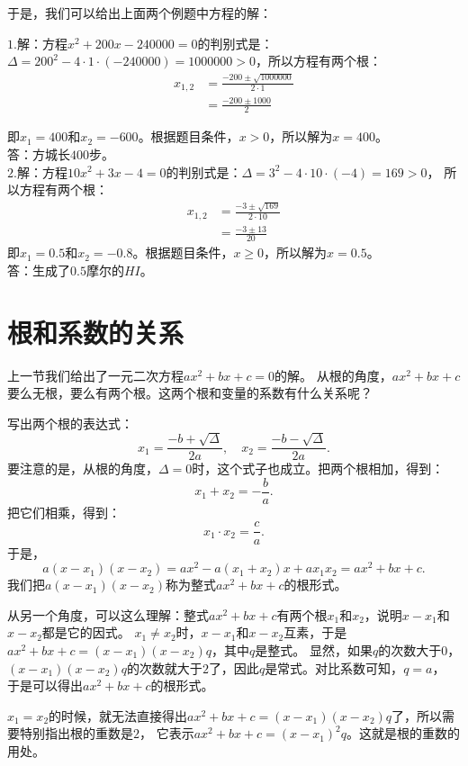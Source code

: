 \documentclass[12pt,UTF8]{ctexbook}
\begin{document}
于是，我们可以给出上面两个例题中方程的解：
\begin{so}
    $1.$解：方程$ x^2 + 200x - 240000 = 0$的判别式是：
    $\Delta = 200^2 - 4\cdot 1\cdot (-240000) = 1000000 > 0$，所以方程有两个根：
    \begin{align*}
        x_{1,2} &= \frac{-200 \pm \sqrt{1000000}}{2\cdot 1}  \\
        &= \frac{-200 \pm 1000}{2} 
    \end{align*}

    即$x_1 = 400$和$x_2 = -600$。根据题目条件，$x>0$，所以解为$x = 400$。\\
    答：方城长$400$步。\\
    $2.$解：方程$10x^2 + 3x - 4 = 0$的判别式是：$\Delta = 3^2 - 4\cdot 10\cdot (-4) = 169 > 0$，
    所以方程有两个根：
    \begin{align*}
        x_{1,2} &= \frac{-3 \pm \sqrt{169}}{2\cdot 10}  \\
        &= \frac{-3 \pm 13}{20} 
    \end{align*}
    即$x_1 = 0.5$和$x_2 = -0.8$。根据题目条件，$x\geqslant 0$，所以解为$x = 0.5$。\\
    答：生成了$0.5$摩尔的$HI$。
\end{so}

\section{根和系数的关系}

上一节我们给出了一元二次方程$ax^2 + bx + c = 0$的解。
从根的角度，$ax^2 + bx + c $要么无根，要么有两个根。这两个根和变量的系数有什么关系呢？

写出两个根的表达式：
$$x_{1} = \frac{-b + \sqrt{\Delta}}{2a},\quad x_{2} = \frac{-b - \sqrt{\Delta}}{2a}.$$
要注意的是，从根的角度，$\Delta = 0$时，这个式子也成立。把两个根相加，得到：
$$ x_1 + x_2 = -\frac{b}{a}.$$
把它们相乘，得到：
$$ x_1 \cdot x_2 = \frac{c}{a}.$$
于是，
$$a(x - x_1)(x - x_2) = ax^2 - a(x_1 + x_2)x + ax_1x_2 = ax^2 + bx+c.$$
我们把$a(x - x_1)(x - x_2)$称为整式$ax^2 + bx+c$的根形式。

从另一个角度，可以这么理解：整式$ax^2 + bx + c$有两个根$x_1$和$x_2$，说明$x - x_1$和$x - x_2$都是它的因式。
$x_1 \neq x_2$时，$x - x_1$和$x - x_2$互素，于是$ax^2 + bx + c = (x - x_1)(x-x_2)q$，其中$q$是整式。
显然，如果$q$的次数大于$0$，$(x - x_1)(x-x_2)q$的次数就大于$2$了，因此$q$是常式。对比系数可知，$q = a$，
于是可以得出$ax^2 + bx+c$的根形式。

$x_1 = x_2$的时候，就无法直接得出$ax^2 + bx + c = (x - x_1)(x-x_2)q$了，所以需要特别指出根的重数是$2$，
它表示$ax^2 + bx + c = (x - x_1)^2 q$。这就是根的重数的用处。
\end{document}
